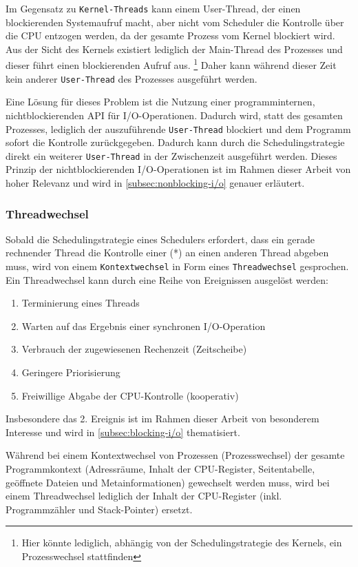 Im Gegensatz zu \verb|Kernel-Threads| kann einem User-Thread, der einen blockierenden Systemaufruf macht, aber nicht vom Scheduler die Kontrolle über die CPU
entzogen werden, da der gesamte Prozess vom Kernel blockiert wird. Aus der Sicht des Kernels existiert lediglich der Main-Thread des Prozesses und dieser
führt einen blockierenden Aufruf aus. \footnote{Hier könnte lediglich, abhängig von der Schedulingstrategie des Kernels, ein Prozesswechsel stattfinden}
Daher kann während dieser Zeit kein anderer \verb|User-Thread| des Prozesses ausgeführt werden.

Eine Lösung für dieses Problem ist die Nutzung einer programminternen, nichtblockierenden API für I/O-Operationen.
Dadurch wird, statt des gesamten Prozesses, lediglich der auszuführende \verb|User-Thread| blockiert und dem Programm sofort
die Kontrolle zurückgegeben. Dadurch kann durch die Schedulingstrategie direkt ein weiterer \verb|User-Thread| in der Zwischenzeit ausgeführt werden.
\parencite[Kapitel 2.2.4]{Tanenbaum2016}
Dieses Prinzip der nichtblockierenden I/O-Operationen ist im Rahmen dieser Arbeit von hoher Relevanz und wird in \ref{subsec:nonblocking-i/o}
genauer erläutert.

\subsubsection{Threadwechsel}
\label{subsubsec:threadwechsel}
Sobald die Schedulingstrategie eines Schedulers erfordert, dass ein gerade rechnender Thread die Kontrolle einer (*) an
einen anderen Thread abgeben muss, wird von einem \verb|Kontextwechsel| in Form eines \verb|Threadwechsel| gesprochen.
Ein Threadwechsel kann durch eine Reihe von Ereignissen ausgelöst werden:
\begin{enumerate}
  \item Terminierung eines Threads
  \item Warten auf das Ergebnis einer synchronen I/O-Operation
  \item Verbrauch der zugewiesenen Rechenzeit (Zeitscheibe)
  \item Geringere Priorisierung
  \item Freiwillige Abgabe der CPU-Kontrolle (kooperativ)
\end{enumerate}

Insbesondere das 2. Ereignis ist im Rahmen dieser Arbeit von besonderem Interesse und wird in \ref{subsec:blocking-i/o} thematisiert.

Während bei einem Kontextwechsel von Prozessen (Prozesswechsel) der gesamte Programmkontext (Adressräume, Inhalt der CPU-Register,
Seitentabelle, geöffnete Dateien und Metainformationen)
gewechselt werden muss, wird bei einem Threadwechsel lediglich der Inhalt der CPU-Register (inkl. Programmzähler und Stack-Pointer)
ersetzt.\parencite{Mosberger2002}

